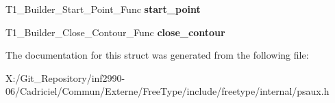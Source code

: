 \begin{DoxyCompactItemize}
\item 
\hypertarget{struct_t1___builder___funcs_rec___ab4897186c65875b4312d4ef68aad9d02}{T1\-\_\-\-Builder\-\_\-\-Start\-\_\-\-Point\-\_\-\-Func {\bfseries start\-\_\-point}}\label{struct_t1___builder___funcs_rec___ab4897186c65875b4312d4ef68aad9d02}

\item 
\hypertarget{struct_t1___builder___funcs_rec___abe163896432cc768719bf87cef0d1266}{T1\-\_\-\-Builder\-\_\-\-Close\-\_\-\-Contour\-\_\-\-Func {\bfseries close\-\_\-contour}}\label{struct_t1___builder___funcs_rec___abe163896432cc768719bf87cef0d1266}

\end{DoxyCompactItemize}


The documentation for this struct was generated from the following file\-:\begin{DoxyCompactItemize}
\item 
X\-:/\-Git\-\_\-\-Repository/inf2990-\/06/\-Cadriciel/\-Commun/\-Externe/\-Free\-Type/include/freetype/internal/psaux.\-h\end{DoxyCompactItemize}
